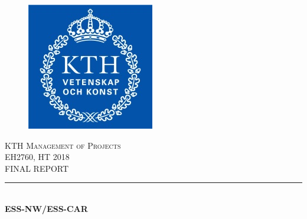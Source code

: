 \documentclass[11pt, titlepage]{article} %
\begin{document}
{} %



\begin{titlepage} %
	\newcommand{\HRule}{\rule{\linewidth}{0.5mm}} %
	
	\center %
	
	
	\begin{figure}
   		\centering
    	\includegraphics[scale=1]{kthLogo.png}
	\end{figure}
	
	\textsc{\LARGE KTH Management of Projects}\\[1cm] %
	
	\textsc{\Large EH2760, HT 2018}\\[0.5cm] %
	
	\textsc{\Large FINAL REPORT}\\[0.5cm] %
	
	
	\HRule\\[0.4cm]
	
	{\huge\bfseries ESS-NW/ESS-CAR}\\[0.4cm] %
	

\end{titlepage}
\end{document}
